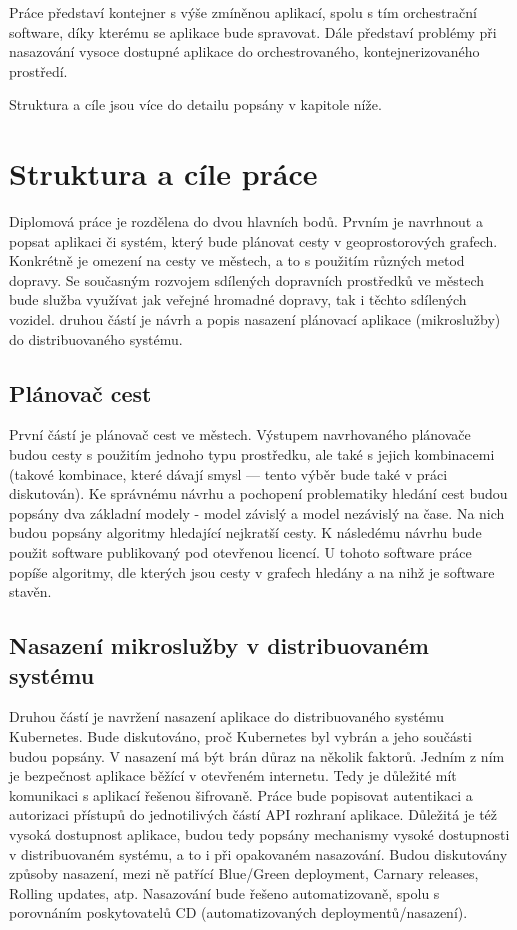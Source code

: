 \documentclass[thesis=M,czech]{FITthesis}[2019/12/23]
\theoremstyle{plain}
\theoremstyle{definition}
\begin{document}
\begin{introduction}
Práce představí kontejner s výše zmíněnou aplikací, spolu s tím orchestrační software, díky kterému se aplikace bude spravovat. Dále představí problémy při nasazování vysoce dostupné aplikace do orchestrovaného, kontejnerizovaného prostředí. 

Struktura a cíle jsou více do detailu popsány v kapitole níže.

\end{introduction}

\chapter{Struktura a cíle práce}


Diplomová práce je rozdělena do dvou hlavních bodů. Prvním je navrhnout a popsat aplikaci či systém, který bude plánovat cesty v geoprostorových grafech. Konkrétně je omezení  na cesty ve městech, a to s použitím různých metod dopravy. Se současným rozvojem sdílených dopravních prostředků ve městech bude služba využívat jak veřejné hromadné dopravy, tak i těchto sdílených vozidel. druhou částí je návrh a popis nasazení plánovací aplikace (mikroslužby) do distribuovaného systému.

\section{Plánovač cest}


První částí je plánovač cest ve městech. Výstupem navrhovaného plánovače budou cesty s použitím jednoho typu prostředku, ale také s jejich kombinacemi (takové kombinace, které dávají smysl — tento výběr bude také v práci diskutován).  Ke správnému návrhu a pochopení problematiky hledání cest budou popsány dva základní modely - model závislý a model nezávislý na čase. Na nich budou popsány algoritmy hledající nejkratší cesty.  K následému návrhu bude použit software publikovaný pod otevřenou licencí. U tohoto software práce popíše algoritmy, dle kterých jsou cesty v grafech hledány a na nihž je software stavěn. 


\section{Nasazení mikroslužby v distribuovaném systému}



Druhou částí je navržení nasazení aplikace do distribuovaného systému Kubernetes. Bude diskutováno, proč Kubernetes byl vybrán a jeho součásti budou popsány. V nasazení má být brán důraz na několik faktorů. Jedním z ním je bezpečnost aplikace běžící v otevřeném internetu. Tedy je důležité mít komunikaci s aplikací řešenou šifrovaně. Práce bude popisovat autentikaci a autorizaci přístupů do jednotilivých částí API rozhraní aplikace. Důležitá je též vysoká dostupnost aplikace, budou tedy popsány mechanismy vysoké dostupnosti v distribuovaném systému, a to i při opakovaném nasazování. Budou diskutovány způsoby nasazení, mezi ně patřící Blue/Green deployment, Carnary releases, Rolling updates, atp. Nasazování bude řešeno automatizovaně, spolu s porovnáním poskytovatelů CD (automatizovaných deploymentů/nasazení).
\end{document}
